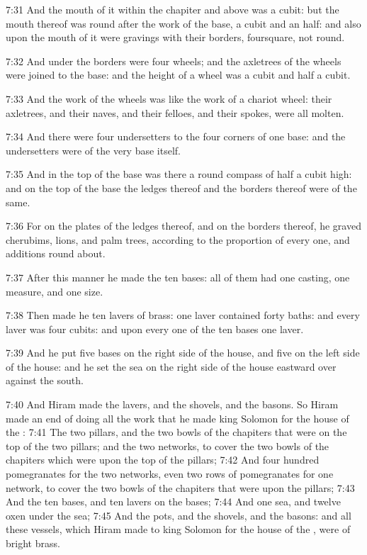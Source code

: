 7:31 And the mouth of it within the chapiter and above was a cubit:
but the mouth thereof was round after the work of the base, a cubit
and an half: and also upon the mouth of it were gravings with their
borders, foursquare, not round.

7:32 And under the borders were four wheels; and the axletrees of the
wheels were joined to the base: and the height of a wheel was a cubit
and half a cubit.

7:33 And the work of the wheels was like the work of a chariot wheel:
their axletrees, and their naves, and their felloes, and their spokes,
were all molten.

7:34 And there were four undersetters to the four corners of one base:
and the undersetters were of the very base itself.

7:35 And in the top of the base was there a round compass of half a
cubit high: and on the top of the base the ledges thereof and the
borders thereof were of the same.

7:36 For on the plates of the ledges thereof, and on the borders
thereof, he graved cherubims, lions, and palm trees, according to the
proportion of every one, and additions round about.

7:37 After this manner he made the ten bases: all of them had one
casting, one measure, and one size.

7:38 Then made he ten lavers of brass: one laver contained forty
baths: and every laver was four cubits: and upon every one of the ten
bases one laver.

7:39 And he put five bases on the right side of the house, and five on
the left side of the house: and he set the sea on the right side of
the house eastward over against the south.

7:40 And Hiram made the lavers, and the shovels, and the basons. So
Hiram made an end of doing all the work that he made king Solomon for
the house of the \LORD: 7:41 The two pillars, and the two bowls of the
chapiters that were on the top of the two pillars; and the two
networks, to cover the two bowls of the chapiters which were upon the
top of the pillars; 7:42 And four hundred pomegranates for the two
networks, even two rows of pomegranates for one network, to cover the
two bowls of the chapiters that were upon the pillars; 7:43 And the
ten bases, and ten lavers on the bases; 7:44 And one sea, and twelve
oxen under the sea; 7:45 And the pots, and the shovels, and the
basons: and all these vessels, which Hiram made to king Solomon for
the house of the \LORD, were of bright brass.

